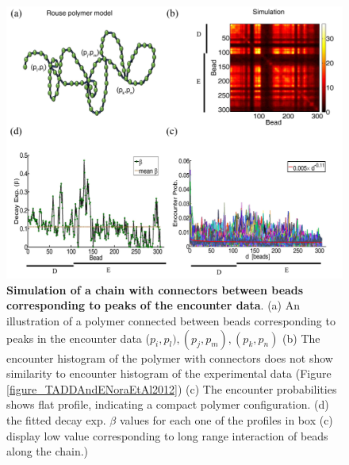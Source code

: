 \documentclass[12pt]{article}
\begin{document}
\begin{figure}[H]
\includegraphics[scale=0.5]{Figure02_LoopsCorrespondingToPeaks307Beads}
\caption{\textbf{Simulation of a chain with connectors between beads corresponding to peaks of the encounter data}. (a) An illustration of a polymer connected between beads corresponding to peaks in the encounter data ($p_i,p_l), (p_j,p_m), (p_k,p_n)$ (b) The encounter histogram of the polymer with connectors does not show similarity to encounter histogram of the experimental data (Figure \ref{figure_TADDAndENoraEtAl2012}) (c) The encounter probabilities shows flat profile, indicating a compact polymer configuration. (d) the fitted decay exp. $\beta$ values for each one of the profiles in box (c) display low value corresponding to long range interaction of beads along the chain.)}
\label{figure_encounterProbabilityPeaksOfTheEncounterData}
\end{figure}
\end{document}
